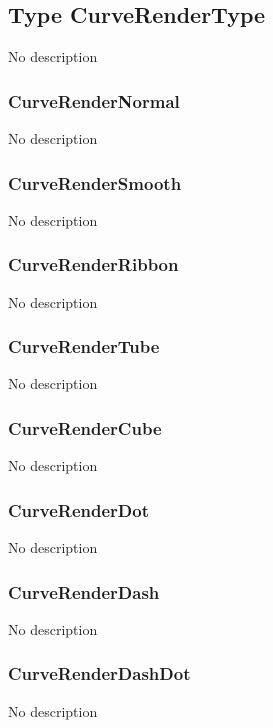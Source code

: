 \subsection{Type CurveRenderType \label{T:CurveRenderType}}
No description

\subsubsection{CurveRenderNormal \label{T:CurveRenderType|CurveRenderNormal}}
No description

\subsubsection{CurveRenderSmooth \label{T:CurveRenderType|CurveRenderSmooth}}
No description

\subsubsection{CurveRenderRibbon \label{T:CurveRenderType|CurveRenderRibbon}}
No description

\subsubsection{CurveRenderTube \label{T:CurveRenderType|CurveRenderTube}}
No description

\subsubsection{CurveRenderCube \label{T:CurveRenderType|CurveRenderCube}}
No description

\subsubsection{CurveRenderDot \label{T:CurveRenderType|CurveRenderDot}}
No description

\subsubsection{CurveRenderDash \label{T:CurveRenderType|CurveRenderDash}}
No description

\subsubsection{CurveRenderDashDot \label{T:CurveRenderType|CurveRenderDashDot}}
No description

